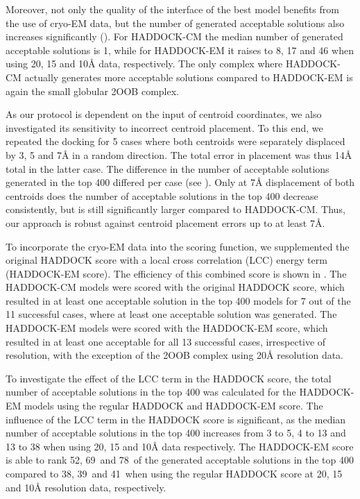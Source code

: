 Moreover, not only the quality of the interface of the best model benefits from
the use of cryo-EM data, but the number of generated acceptable solutions also
increases significantly (). For HADDOCK-CM the
median number of generated acceptable solutions is 1, while for HADDOCK-EM it
raises to 8, 17 and 46 when using 20, 15 and 10Å data, respectively. The
only complex where HADDOCK-CM actually generates more acceptable solutions
compared to HADDOCK-EM is again the small globular 2OOB complex.

As our protocol is dependent on the input of centroid coordinates, we also
investigated its sensitivity to incorrect centroid placement.  To this end, we
repeated the docking for 5 cases where both centroids were separately displaced
by 3, 5 and 7Å in a random direction.  The total error in placement
was thus 14Å total in the latter case. The difference in the number of
acceptable solutions generated in the top 400 differed per case (see
).  Only at 7Å displacement of
both centroids does the number of acceptable solutions in the top 400 decrease
consistently, but is still significantly larger compared to HADDOCK-CM.  Thus,
our approach is robust against centroid placement errors up to at least
7Å.




To incorporate the cryo-EM data into the scoring function, we supplemented the
original HADDOCK score with a local cross correlation (LCC) energy term
(HADDOCK-EM score).  The efficiency of this combined score is shown in
.  The HADDOCK-CM models were scored with the
original HADDOCK score, which resulted in at least one acceptable solution in
the top 400 models for 7 out of the 11 successful cases, where at least one
acceptable solution was generated.  The HADDOCK-EM models were scored with the
HADDOCK-EM score, which resulted in at least one acceptable for all 13
successful cases, irrespective of resolution, with the exception of the 2OOB
complex using 20Å resolution data.

To investigate the effect of the LCC term in the HADDOCK score, the total
number of acceptable solutions in the top 400 was calculated for the HADDOCK-EM
models using the regular HADDOCK and HADDOCK-EM score.  The influence of the
LCC term in the HADDOCK score is significant, as the median number of
acceptable solutions in the top 400 increases from 3 to 5, 4 to 13 and 13 to 38
when using 20, 15 and 10Å data respectively.  The HADDOCK-EM score is
able to rank 52\percent, 69\percent\ and 78\percent\ of the generated acceptable solutions in the
top 400 compared to 38\percent, 39\percent\ and 41\percent\ when using the regular HADDOCK score at
20, 15 and 10Å resolution data, respectively.

